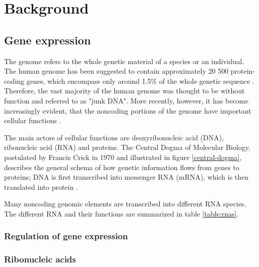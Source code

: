 


\section{Background}\label{background}











\subsection{Gene expression}\label{gene-expression}

The genome refers to the whole genetic material of a species or an individual.
The human genome has been suggested to contain approximately 20 500
protein-coding genes, which encompass only around 1.5\% of the whole genetic sequence
\citep{Clamp2007}. Therefore, the vast majority of the human genome was thought
to be without function and referred to as "junk DNA". More recently, however,
it has become increasingly evident, that the noncoding portions of the
genome have important cellular functions \citep{ENCODE?}.

The main actors of cellular functions are deoxyribonucleic acid (DNA),
ribonucleic acid (RNA) and proteins. The Central Dogma of
Molecular Biology, postulated by Francis Crick in 1970 and
illustrated in figure \ref{central-dogma}, describes the general schema of
how genetic information flows from genes to proteins; DNA is first
transcribed into messenger RNA (mRNA), which is then translated into protein
\citep{Crick1970}.

Many noncoding genomic elements are transcribed into
different RNA species. The different RNA and their functions are
summarized in table \ref{table:rnas}.




\subsubsection{Regulation of gene expression}\label{regulation-of-gene-expression}





\subsubsection{Ribonucleic acids}\label{ribonucleic-acids}

